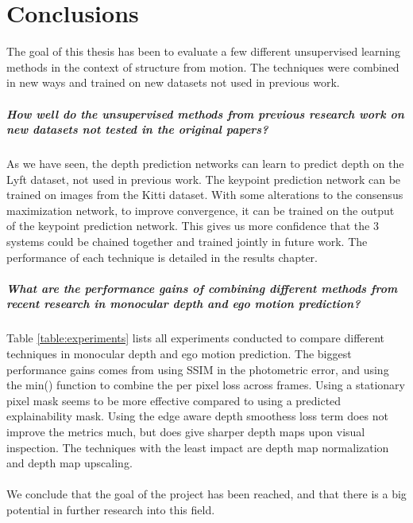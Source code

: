 \chapter{Conclusions}\label{cha:conclusions}

The goal of this thesis has been to evaluate a few different unsupervised learning methods in the context of structure from motion. The techniques were combined in new ways and trained on new datasets not used in previous work.

\paragraph{\textbf{How well do the unsupervised methods from previous research work on new datasets not tested in the original papers?}} As we have seen, the depth prediction networks can learn to predict depth on the Lyft dataset, not used in previous work. The keypoint prediction network can be trained on images from the Kitti dataset. With some alterations to the consensus maximization network, to improve convergence, it can be trained on the output of the keypoint prediction network. This gives us more confidence that the 3 systems could be chained together and trained jointly in future work. The performance of each technique is detailed in the results chapter.

\paragraph{\textbf{What are the performance gains of combining different methods from recent research in monocular depth and ego motion prediction?}} Table \ref{table:experiments} lists all experiments conducted to compare different techniques in monocular depth and ego motion prediction. The biggest performance gains comes from using SSIM in the photometric error, and using the min() function to combine the per pixel loss across frames. Using a stationary pixel mask seems to be more effective compared to using a predicted explainability mask. Using the edge aware depth smoothess loss term does not improve the metrics much, but does give sharper depth maps upon visual inspection. The techniques with the least impact are depth map normalization and depth map upscaling.
\\
\\
We conclude that the goal of the project has been reached, and that there is a big potential in further research into this field.